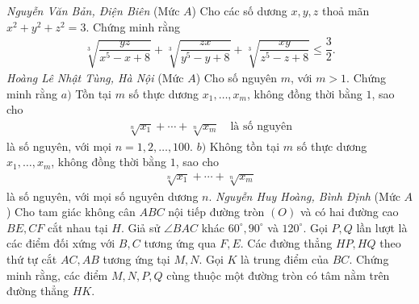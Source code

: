 \begin{multicols}{2}
\begin{figure}[H]
		\vspace*{-15pt}
	\end{figure}
	\hfill	\textit{\small Nguyễn Văn Bản, Điện Biên}
	\vskip 0.05cm
	{}
	(Mức $A$) Cho các số dương $x,y,z$ thoả mãn $x^2+y^2+z^2=3$. Chứng minh rằng
	\begin{align*}
		\sqrt[3]{\dfrac{y z}{x^5\!-\!x\!+\!8}}\!+\!\sqrt[3]{\dfrac{z x}{y^5\!-\!y\!+\!8}}\!+\!\sqrt[3]{\dfrac{x y}{z^5\!-\!z\!+\!8}} \!\le\! \dfrac{3}{2}.
	\end{align*}
	\hfill \textit{Hoàng Lê Nhật Tùng, Hà Nội}
	\vskip 0.05cm
	{}
	(Mức $A$) Cho số nguyên $m$, với $m>1$. Chứng minh rằng
	\vskip 0.05cm
	$a)$ Tồn tại $m$ số thực dương $x_1,\ldots,x_m$, không đồng thời bằng $1$, sao cho
	\begin{align*}
		\sqrt[n]{x_1}+\cdots+\sqrt[n]{x_m}\quad\text{là số nguyên}
	\end{align*}
	là số nguyên, với mọi $n=1,2,\ldots,100$.
	\vskip 0.05cm
	$b)$ Không tồn  tại $m$ số thực dương $x_1,\ldots,x_m$, không đồng thời bằng $1$, sao cho
	\begin{align*}
		\sqrt[n]{x_1}+\cdots+\sqrt[n]{x_m}
	\end{align*}
	là số nguyên, với mọi số nguyên dương $n$.
	\vskip 0.05cm
	\hfill	\textit{\small Nguyễn Huy Hoàng, Bình Định}
	\vskip 0.05cm
	\columnbreak
	{}
	(Mức $A$) Cho tam giác không cân $ABC$ nội tiếp đường tròn $(O)$ và có hai đường cao $BE,CF$ cắt nhau tại $H$. Giả sử   $\angle BAC$ khác $60^\circ,90^\circ$ và $120^\circ$.  Gọi $P, Q$ lần lượt là các điểm đối xứng với $B,C $ tương ứng qua $F, E$. Các đường thẳng $HP, HQ$ theo thứ tự cắt $AC, AB$ tương ứng tại $M, N$.  Gọi $K$ là trung điểm của $BC$. Chứng minh rằng, các điểm $M, N, P, Q$ cùng thuộc một đường tròn có tâm nằm trên đường thẳng $HK$.
	\begin{figure}[H]
		\vspace*{-15pt}

\end{figure}
\end{multicols}
